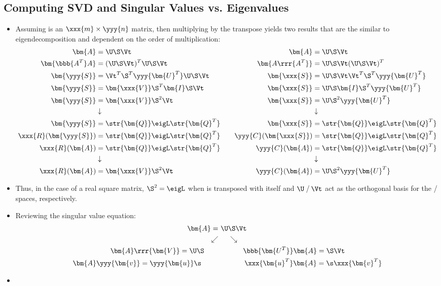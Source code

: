 \begin{itemize}
  \newpage
  \subsection{Computing SVD and Singular Values vs. Eigenvalues}\label{Computing SVD and Singular Values vs. Eigenvalues}
  \begin{itemize}
    \item Assuming  is an \(\xxx{m} \times \yyy{n} \) matrix, then multiplying by the transpose yields two results that are the similar to eigendecomposition and dependent on the order of multiplication:
    \begin{align*}
      \bm{A} &= \U \S \Vt &&& \bm{A} &= \U \S \Vt \\
      \bm{\bbb{A^T}A} &= (\U\S\Vt)^T \U\S\Vt &&& \bm{A\rrr{A^T}} &=  \U\S\Vt (\U\S\Vt)^T \\
      \bm{\yyy{S}} &= \Vt^T\S^T\yyy{\bm{U}^T} \U\S\Vt &&& \bm{\xxx{S}} &=  \U\S\Vt \Vt^T\S^T\yyy{\bm{U}^T} \\
      \bm{\yyy{S}} &= \bm{\xxx{V}}\S^T\bm{I}\S\Vt &&& \bm{\xxx{S}} &=  \U\S\bm{I}\S^T\yyy{\bm{U}^T} \\
      \bm{\yyy{S}} &= \bm{\xxx{V}}\S^2\Vt &&& \bm{\xxx{S}} &=  \U\S^2\yyy{\bm{U}^T} \\
      &\downarrow &&& &\downarrow \\
      \bm{\yyy{S}} &= \str{\bm{Q}}\eigL \str{\bm{Q}^T} &&& \bm{\xxx{S}} &= \str{\bm{Q}}\eigL \str{\bm{Q}^T} \\
      \xxx{R}(\bm{\yyy{S}}) &= \str{\bm{Q}}\eigL \str{\bm{Q}^T} &&& \yyy{C}(\bm{\xxx{S}}) &= \str{\bm{Q}}\eigL \str{\bm{Q}^T} \\
      \xxx{R}(\bm{A}) &= \str{\bm{Q}}\eigL \str{\bm{Q}^T} &&& \yyy{C}(\bm{A}) &= \str{\bm{Q}}\eigL \str{\bm{Q}^T} \\
      &\downarrow &&& &\downarrow \\ 
      \xxx{R}(\bm{A}) &= \bm{\xxx{V}}\S^2\Vt &&& \yyy{C}(\bm{A}) &=  \U\S^2\yyy{\bm{U}^T} 
    \end{align*}
    \item Thus, in the case of a real square matrix, \(\S^2 = \eigL\) when  is transposed with itself and \(\U\)\,/\,\(\Vt\) act as the orthogonal basis for the / spaces, respectively.
    \item Reviewing the singular value equation:
    \begin{align*}
      \bm{A} = &~\U \S \Vt \\ 
      \swarrow &\hspace{14pt} \searrow \\
      \bm{A}\rrr{\bm{V}} = \U \S \hspace{20pt}&\hspace{35pt} \bbb{\bm{U^T}}\bm{A} = \S \Vt \\
      \bm{A}\yyy{\bm{v}}= \yyy{\bm{u}} \s \hspace{24pt}&\hspace{37pt} \xxx{\bm{u}^T}\bm{A}=\s \xxx{\bm{v}^T} 
    \end{align*}
    \item 
  \end{itemize}


\end{itemize}
